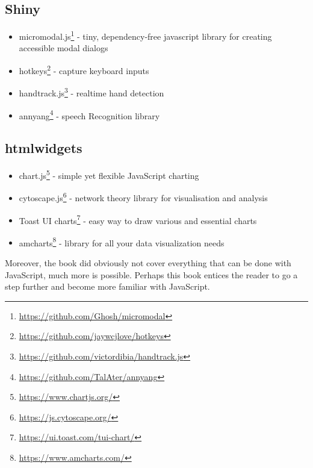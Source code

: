 \documentclass[
]{krantz}
\providecommand{\tightlist}{%
  \setlength{\itemsep}{0pt}\setlength{\parskip}{0pt}}
\renewcommand{\href}[2]{#2\footnote{\url{#1}}}
\begin{document}
\hypertarget{shiny}{%
\subsection{Shiny}\label{shiny}}

\begin{itemize}
\tightlist
\item
  \href{https://github.com/Ghosh/micromodal}{micromodal.js} - tiny, dependency-free javascript library for creating accessible modal dialogs
\item
  \href{https://github.com/jaywcjlove/hotkeys}{hotkeys} - capture keyboard inputs
\item
  \href{https://github.com/victordibia/handtrack.js}{handtrack.js} - realtime hand detection
\item
  \href{https://github.com/TalAter/annyang}{annyang} - speech Recognition library
\end{itemize}

\hypertarget{htmlwidgets}{%
\subsection{htmlwidgets}\label{htmlwidgets}}

\begin{itemize}
\tightlist
\item
  \href{https://www.chartjs.org/}{chart.js} - simple yet flexible JavaScript charting
\item
  \href{https://js.cytoscape.org/}{cytoscape.js} - network theory library for visualisation and analysis
\item
  \href{https://ui.toast.com/tui-chart/}{Toast UI charts} - easy way to draw various and essential charts
\item
  \href{https://www.amcharts.com/}{amcharts} - library for all your data visualization needs
\end{itemize}

Moreover, the book did obviously not cover everything that can be done with JavaScript, much more is possible. Perhaps this book entices the reader to go a step further and become more familiar with JavaScript.

  

\backmatter
\printindex
\end{document}
